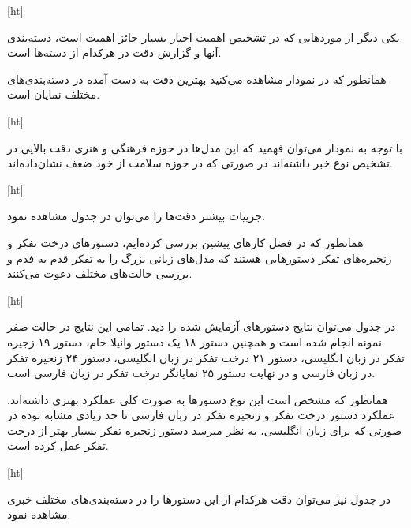 [ht]

\pagebreak

یکی دیگر از موردهایی که در تشخیص اهمیت اخبار بسیار حائز اهمیت است، دسته‌بندی آنها و گزارش دقت در هرکدام از دسته‌ها است.

همانطور که در نمودار  مشاهده می‌کنید بهترین دقت به دست آمده در دسته‌بندی‌های مختلف نمایان است.

[ht]

با توجه به نمودار می‌توان فهمید که این مدل‌ها در حوزه فرهنگی و هنری دقت بالایی در تشخیص نوع خبر داشته‌اند در صورتی که در حوزه سلامت از خود ضعف نشان‌داده‌اند.

[ht]

جزییات بیشتر دقت‌ها را می‌توان در جدول  مشاهده نمود.

\pagebreak
{}
همانطور که در فصل کارهای پیشین بررسی کرده‌ایم، دستورهای درخت تفکر و زنجیره‌های تفکر دستورهایی هستند که مدل‌های زبانی بزرگ را به تفکر قدم به فدم و بررسی حالت‌های مختلف دعوت می‌کنند.

[ht]

در جدول  می‌توان نتایج دستور‌های آزمایش شده را دید. تمامی این نتایج در حالت صفر نمونه انجام شده است و همچنین دستور ۱۸ یک دستور وانیلا خام، دستور ۱۹ زجیره تفکر در زبان انگلیسی، دستور ۲۱ درخت تفکر در زبان انگلیسی، دستور ۲۴ زنجیره تفکر در زبان فارسی و در نهایت دستور ۲۵ نمایانگر درخت تفکر در زبان فارسی است.

همانطور که مشخص است این نوع دستور‌ها به صورت کلی  عملکرد بهتری داشته‌اند. عملکرد دستور درخت تفکر و زنجیره تفکر در زبان فارسی تا حد زیادی مشابه بوده در صورتی که برای زبان انگلیسی، به نظر میرسد دستور زنجیره تفکر بسیار بهتر از درخت تفکر عمل کرده است.

[ht]

در جدول  نیز می‌توان دقت هرکدام از این دستورها را در دسته‌بندی‌های مختلف خبری مشاهده نمود.


